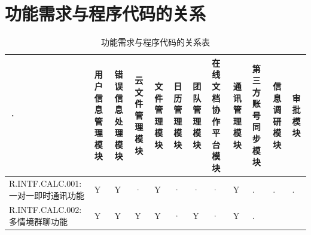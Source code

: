 \section{\color{red}功能需求与程序代码的关系}
    \begin{table}[htbp]
        \centering
        \small
        \caption{\color{red}功能需求与程序代码的关系表} \label{tab:requirement-module}
            \begin{tabular}{|p{9em}|p{2em}|p{2em}|p{2em}|p{2em}|p{2em}|
                            p{2em}|p{2em}|p{2em}|p{2em}|p{2em}|p{2em}|}
            \hline %
            ·   & 用户信息管理模块      & 错误信息处理模块  & 云文件管理模块 
                & 文件管理模块          & 日历管理模块      & 团队管理模块      
                & 在线文档协作平台模块  & 通讯管理模块      & {\color{red}第三方账号同步模块}
                & {\color{red}信息调研模块}                 & {\color{red}审批模块}         \\
            \hline %
            R.INTF.CALC.001: 一对一即时通讯功能
                & Y                     & Y                 & · 
                & Y                     & ·                 & · 
                & ·                     & Y                 & .
                & .                     & . \\
            \hline  %
            R.INTF.CALC.002: 多情境群聊功能
                & Y                     & Y                 & Y
                & Y                     & ·                 & Y 
                & ·                     & Y                 & .

\end{tabular}
\end{table}
